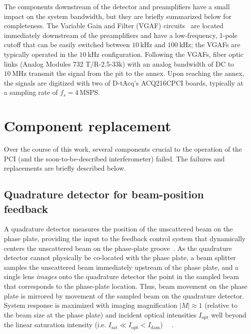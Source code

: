 The components downstream of the detector and preamplifiers
have a small impact on the system bandwidth, but
they are briefly summarized below for completeness.
The Variable Gain and Filter (VGAF) circuits~\cite[Sec.~3.3.3]{dorris_phd}
are located immediately downstream of the preamplifiers and
have a low-frequency, 1-pole cutoff that can be easily switched between
$\SI{10}{\kilo\hertz}$ and $\SI{100}{\kilo\hertz}$;
the VGAFs are typically operated in the $\SI{10}{\kilo\hertz}$ configuration.
Following the VGAFs,
fiber optic links (Analog Modules 732 T/R-2.5-33k)
with an analog bandwidth of DC to $\SI{10}{\mega\hertz}$
transmit the signal from the \diiid \space pit to the annex.
Upon reaching the annex,
the signals are digitized with two of D-tAcq's ACQ216CPCI boards,
typically at a sampling rate of $f_s = 4 \, \text{MSPS}$.


\section{Component replacement}
Over the course of this work,
several components crucial to the operation of the PCI
(and the soon-to-be-described interferometer)
failed.
The failures and replacements are briefly described below.


\subsection{Quadrature detector for beam-position feedback}
A quadrature detector measures the position
of the unscattered beam on the phase plate,
providing the input to the feedback control system
that dynamically centers the unscattered beam
on the phase-plate groove~\cite[Sec.~3.5]{coda_phd}.
As the quadrature detector
cannot physically be co-located with the phase plate,
a beam splitter samples the unscattered beam
immediately upstream of the phase plate, and
a single lens \emph{images} onto the quadrature detector
the point in the sampled beam that corresponds to the phase-plate location.
Thus, beam movement on the phase plate is mirrored
by movement of the sampled beam on the quadrature detector.
System response is maximized
with imaging magnification $|M| \approx 1$
(relative to the beam size at the phase plate) and
incident optical intensities $I_{\text{opt}}$
well beyond the linear saturation intensity
(i.e. $I_{\text{sat}} \ll I_{\text{opt}} < I_{\text{dam}}$)
~\cite{marinoni_FB_detector_report}~\cite[Sec.~3.5(b)]{coda_phd}.

